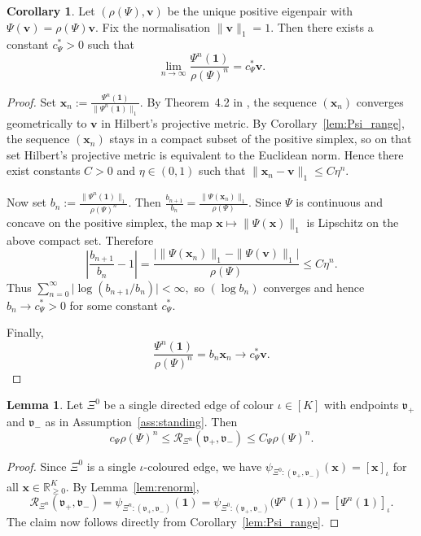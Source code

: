 \documentclass{article}
\theoremstyle{plain}
\theoremstyle{definition}
\newtheorem{lemma}[theorem]{Lemma}
\newtheorem{corollary}[theorem]{Corollary}
\newcommand{\Reff}{\mathscr{R}}
\begin{document}
\begin{corollary}\label{cor:Psi_strong_convergence}
Let $(\rho(\Psi),\mathbf v)$ be the unique positive eigenpair with $\Psi(\mathbf v)=\rho(\Psi)\mathbf v$.
Fix the normalisation $\|\mathbf v\|_1=1$.
Then there exists a constant $c_{\Psi}^*>0$ such that
\[
\lim_{n\to\infty}\frac{\Psi^n(\mathbf 1)}{\rho(\Psi)^n}=c_{\Psi}^*\mathbf v.
\]
\end{corollary}

\begin{proof}
Set
$
\mathbf x_n:=\frac{\Psi^n(\mathbf 1)}{\|\Psi^n(\mathbf 1)\|_1}.
$
By Theorem~4.2 in \cite{nussbaum1986convexity}, the sequence $(\mathbf x_n)$ converges geometrically to $\mathbf v$ in Hilbert's projective metric.
By Corollary~\ref{lem:Psi_range}, the sequence $(\mathbf x_n)$ stays in a compact subset of the positive simplex, so on that set Hilbert's projective metric is equivalent to the Euclidean norm.
Hence there exist constants $C>0$ and $\eta\in(0,1)$ such that
$
\|\mathbf x_n-\mathbf v\|_1\le C\eta^n.
$

Now set
$
b_n:=\frac{\|\Psi^n(\mathbf 1)\|_1}{\rho(\Psi)^n}.
$
Then
$
\frac{b_{n+1}}{b_n}
=
\frac{\|\Psi(\mathbf x_n)\|_1}{\rho(\Psi)}.
$
Since $\Psi$ is continuous and concave on the positive simplex, the map $\mathbf x\mapsto \|\Psi(\mathbf x)\|_1$ is Lipschitz on the above compact set.
Therefore
\[
\left|\frac{b_{n+1}}{b_n}-1\right|
=
\frac{\bigl|\|\Psi(\mathbf x_n)\|_1-\|\Psi(\mathbf v)\|_1\bigr|}{\rho(\Psi)}
\le
C\eta^n.
\]
Thus
$
\sum_{n=0}^\infty \bigl|\log(b_{n+1}/b_n)\bigr|<\infty,
$
so $(\log b_n)$ converges and hence $b_n\to c_{\Psi}^*>0$ for some constant $c_{\Psi}^*$.

Finally,
\[
\frac{\Psi^n(\mathbf 1)}{\rho(\Psi)^n}
=
b_n\mathbf x_n
\longrightarrow
c_{\Psi}^*\mathbf v.
\]
\end{proof}

\begin{lemma}\label{lem:Reff-asymp-rho}
Let $\Xi^0$ be a single directed edge of colour $\iota\in[K]$ with endpoints $\mathfrak v_+$ and $\mathfrak v_-$ as in Assumption~\ref{ass:standing}.
Then
\[
c_{\Psi} \rho(\Psi)^n
\le
\Reff_{\Xi^n}(\mathfrak v_+,\mathfrak v_-)
\le
C_{\Psi} \rho(\Psi)^n.
\]
\end{lemma}

\begin{proof}
Since $\Xi^0$ is a single $\iota$-coloured edge, we have
$
\psi_{\Xi^0:(\mathfrak v_+,\mathfrak v_-)}(\mathbf x)=[\mathbf x]_\iota
$
for all $\mathbf x\in\mathbb R_{\ge 0}^K$.
By Lemma~\ref{lem:renorm},
\[
\Reff_{\Xi^n}(\mathfrak v_+,\mathfrak v_-)
=
\psi_{\Xi^n:(\mathfrak v_+,\mathfrak v_-)}(\mathbf 1)
=
\psi_{\Xi^0:(\mathfrak v_+,\mathfrak v_-)}\big(\Psi^n(\mathbf 1)\big)
=
[\Psi^n(\mathbf 1)]_\iota.
\]
The claim now follows directly from Corollary~\ref{lem:Psi_range}.
\end{proof}
\end{document}
